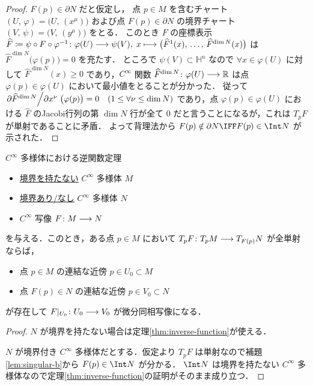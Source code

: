 \documentclass[TQFT_main]{subfiles}
\begin{document}
\begin{proof}
    $F(p) \in \partial N$ だと仮定し， 
    点 $p \in M$ を含むチャート $(U,\, \varphi) = \bigl( U,\, (x^\mu) \bigr) $ および点 $F(p) \in \partial N$ の境界チャート $(V,\, \psi) = \bigl( V,\, (y^\mu) \bigr) $ をとる．
    このとき $F$ の座標表示 $\widehat{F} \coloneqq \psi \circ F \circ \varphi^{-1} \colon \varphi(U) \longrightarrow \psi(V),\; x \longmapsto \bigl( \widehat{F}^1(x),\, \dots,\, \widehat{F}^{\dim N}(x) \bigr)$ は $\widehat{F}^{\dim N} \bigl( \varphi(p) \bigr) = 0$ を充たす．
    ところで $\psi(V) \subset \mathbb{H}^n$ なので $\forall x \in \varphi(U)$ に対して $\widehat{F}^{\dim N} (x) \ge 0$ であり，$C^\infty$ 関数 $\widehat{F}^{\dim N} \colon \varphi(U) \longrightarrow \mathbb{R}$ は点 $\varphi(p) \in \varphi(U)$ において最小値をとることが分かった．
    従って $\pdv*{\widehat{F}^{\dim N}}{x^\nu} ()\bigl(\varphi(p)\bigr) = 0\quad (1 \le \forall \nu \le \dim N)$ であり，点 $\varphi(p) \in \varphi(U)$ における $\widehat{F}$ のJacobi行列の第 $\dim N$ 行が全て $0$ だと言うことになるが，これは $T_p F$ が単射であることに矛盾．
    よって背理法から $F(p) \notin \partial N \IFF F(p) \in \Int N$ が示された．
\end{proof}

\begin{mytheo}[label=thm:inverse-function-b]{$C^\infty$ 多様体における逆関数定理}
    \begin{itemize}
        \item \underline{境界を持たない} $C^\infty$ 多様体 $M$
        \item \underline{境界あり/なし} $C^\infty$ 多様体 $N$
        \item $C^\infty$ 写像 $F \colon M \longrightarrow N$
    \end{itemize}
    を与える．このとき，ある点 $p \in M$ において $T_p F \colon T_p M \longrightarrow T_{F(p)} N$ が全単射ならば，
    \begin{itemize}
        \item 点 $p \in M$ の連結な近傍 $p \in U_0 \subset M$
        \item 点 $F(p) \in N$ の連結な近傍 $p \in V_0 \subset N$
    \end{itemize}
    が存在して $F|_{U_0} \colon U_0 \longrightarrow V_0$ が微分同相写像になる．
\end{mytheo}

\begin{proof}
    $N$ が境界を持たない場合は定理\ref{thm:inverse-function}が使える．

    $N$ が境界付き $C^\infty$ 多様体だとする．仮定より $T_p F$ は単射なので補題\ref{lem:singular-b}から $F(p) \in \Int N$ が分かる．
    $\Int N$ は境界を持たない $C^\infty$ 多様体なので定理\ref{thm:inverse-function}の証明がそのまま成り立つ．

\end{proof}
\end{document}
